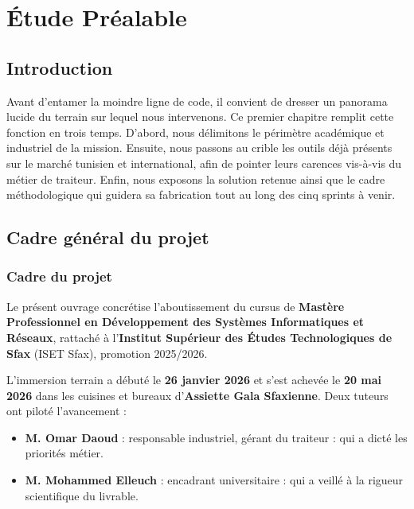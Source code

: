 ﻿%
\chapter{Étude Préalable}

\section{Introduction}

Avant d'entamer la moindre ligne de code, il convient de dresser un panorama lucide du terrain sur lequel nous intervenons. Ce premier chapitre remplit cette fonction en trois temps. D'abord, nous délimitons le périmètre académique et industriel de la mission. Ensuite, nous passons au crible les outils déjà présents sur le marché tunisien et international, afin de pointer leurs carences vis-à-vis du métier de traiteur. Enfin, nous exposons la solution retenue ainsi que le cadre méthodologique qui guidera sa fabrication tout au long des cinq sprints à venir.

\section{Cadre général du projet}

\subsection{Cadre du projet}

Le présent ouvrage concrétise l'aboutissement du cursus de \textbf{Mastère Professionnel en Développement des Systèmes Informatiques et Réseaux}, rattaché à l'\textbf{Institut Supérieur des Études Technologiques de Sfax} (ISET Sfax), promotion 2025/2026.

L'immersion terrain a débuté le \textbf{26 janvier 2026} et s'est achevée le \textbf{20 mai 2026} dans les cuisines et bureaux d'\textbf{Assiette Gala Sfaxienne}. Deux tuteurs ont piloté l'avancement :
\begin{itemize}
    \item \textbf{M. Omar Daoud} : responsable industriel, gérant du traiteur : qui a dicté les priorités métier.
    \item \textbf{M. Mohammed Elleuch} : encadrant universitaire : qui a veillé à la rigueur scientifique du livrable.
\end{itemize}

